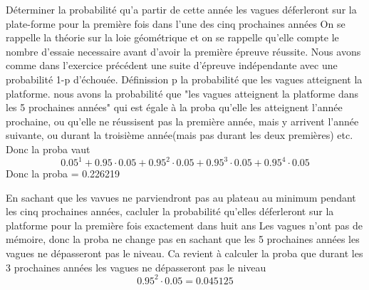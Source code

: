 \begin{exo}
  \begin{subexo}{Déterminer la probabilité qu'a partir de cette année les vagues 
    déferleront sur la plate-forme pour la première fois dans l'une des 
    cinq prochaines années}
    On se rappelle la théorie sur la loie géométrique et on se rappelle qu'elle compte le nombre
    d'essaie necessaire avant d'avoir la première épreuve réussite.
    Nous avons comme dans l'exercice précédent une suite d'épreuve indépendante avec une probabilité
    1-p d'échouée. Définission p la probabilité que les vagues atteignent la platforme.
    nous avons la probabilité que "les vagues atteignent la platforme dans les 5 prochaines années"
    qui est égale à la proba qu'elle les atteignent l'année prochaine, ou qu'elle ne réussisent pas la première année, 
    mais y arrivent l'année suivante, ou durant la troisième année(mais pas durant les deux premières)
    etc.
    Donc la proba vaut 
    \[
    0.05^1 + 0.95\cdot0.05 + 0.95^2\cdot0.05  + 0.95^3\cdot0.05  + 0.95^4\cdot0.05  
    \]
    Donc la proba = 0.226219
  \end{subexo}
  \begin{subexo}{En sachant que les vavues ne parviendront pas au plateau au minimum pendant les 
    cinq prochaines années, cacluler la probabilité qu'elles déferleront sur la platforme pour la première fois exactement dans huit ans}
    Les vagues n'ont pas de mémoire, donc la proba ne change pas en sachant que les 5 prochaines années les vagues ne dépasseront pas le niveau.
    Ca revient à calculer la proba que durant les 3 prochaines années les vagues ne dépasseront pas le niveau
    \[0.95^2 \cdot 0.05 = 0.045125\]
    
  \end{subexo}
\end{exo}
